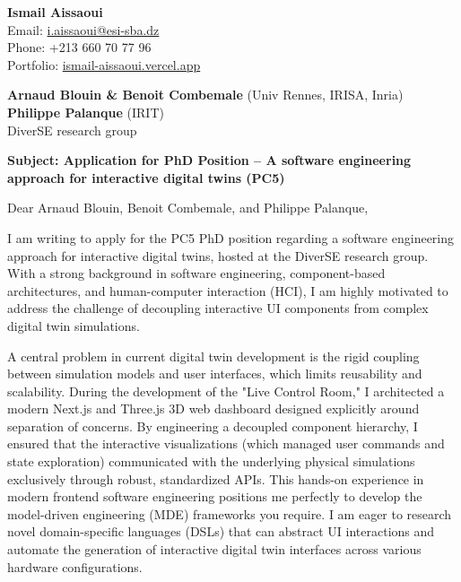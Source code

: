 \documentclass[11pt,a4paper]{article}
\begin{document}
\thispagestyle{empty}

\begin{flushright}
\textbf{Ismail Aissaoui} \\
Email: \href{mailto:i.aissaoui@esi-sba.dz}{i.aissaoui@esi-sba.dz} \\
Phone: +213 660 70 77 96 \\
Portfolio: \href{https://ismail-aissaoui.vercel.app}{ismail-aissaoui.vercel.app}
\end{flushright}

\vspace{1em}

\begin{flushleft}
\textbf{Arnaud Blouin \& Benoit Combemale} (Univ Rennes, IRISA, Inria) \\
\textbf{Philippe Palanque} (IRIT) \\
DiverSE research group
\end{flushleft}

\vspace{1em}
\noindent\textbf{Subject: Application for PhD Position -- A software engineering approach for interactive digital twins (PC5)}
\vspace{1em}

\noindent Dear Arnaud Blouin, Benoit Combemale, and Philippe Palanque,

\vspace{1em}
\noindent
I am writing to apply for the PC5 PhD position regarding a software engineering approach for interactive digital twins, hosted at the DiverSE research group. With a strong background in software engineering, component-based architectures, and human-computer interaction (HCI), I am highly motivated to address the challenge of decoupling interactive UI components from complex digital twin simulations.

\vspace{0.5em}
\noindent
A central problem in current digital twin development is the rigid coupling between simulation models and user interfaces, which limits reusability and scalability. During the development of the "Live Control Room," I architected a modern Next.js and Three.js 3D web dashboard designed explicitly around separation of concerns. By engineering a decoupled component hierarchy, I ensured that the interactive visualizations (which managed user commands and state exploration) communicated with the underlying physical simulations exclusively through robust, standardized APIs. This hands-on experience in modern frontend software engineering positions me perfectly to develop the model-driven engineering (MDE) frameworks you require. I am eager to research novel domain-specific languages (DSLs) that can abstract UI interactions and automate the generation of interactive digital twin interfaces across various hardware configurations.
\end{document}
